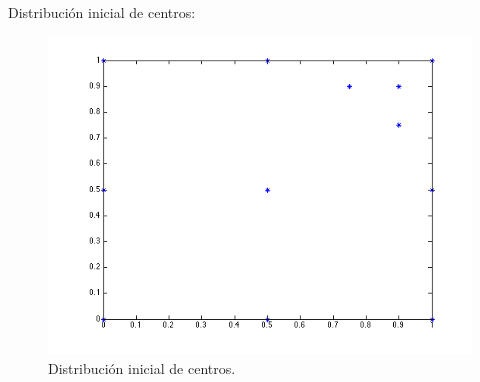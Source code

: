 \documentclass[11pt,a4paper]{article}
\begin{document}
Distribución inicial de centros: 
\begin{figure}[H]
\begin{center}
\includegraphics[scale=.5]{inicial2.png}
\caption{Distribución inicial de centros.}
\end{center}
\end{figure}
\end{document}
